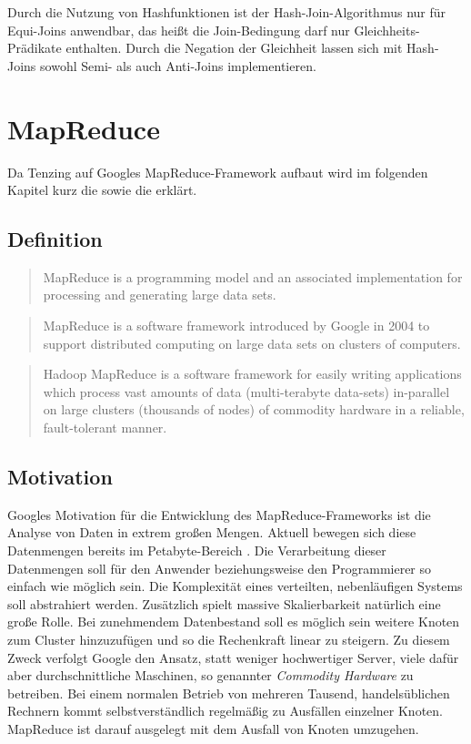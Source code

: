 \documentclass[a4paper]{article}
\begin{document}
Durch die Nutzung von Hashfunktionen ist der Hash-Join-Algorithmus nur für Equi-Joins anwendbar, das heißt die Join-Bedingung darf nur Gleichheits-Prädikate enthalten. Durch die Negation der Gleichheit lassen sich mit Hash-Joins sowohl Semi- als auch Anti-Joins implementieren.

\newpage

\section{MapReduce}
\label{sec:mapreduce}
Da Tenzing auf Googles MapReduce-Framework aufbaut wird im folgenden Kapitel kurz die  sowie die  erklärt.

\subsection{Definition}
\begin{quote}
MapReduce is a programming model and an associated implementation for processing and generating large data sets. \cite{MapReduce:2004}
\end{quote}

\begin{quote}
MapReduce is a software framework introduced by Google in 2004 to support distributed computing on large data sets on clusters of computers. \cite{WP-MAPREDUCE}
\end{quote}

\begin{quote}
Hadoop MapReduce is a software framework for easily writing applications which process vast amounts of data (multi-terabyte data-sets) in-parallel on large clusters (thousands of nodes) of commodity hardware in a reliable, fault-tolerant manner. \cite{Hadoop}
\end{quote}

\subsection{Motivation}
\label{sec:mapreduce-motivation}
Googles Motivation für die Entwicklung des MapReduce-Frameworks ist die Analyse von Daten in extrem großen Mengen. Aktuell bewegen sich diese Datenmengen bereits im Petabyte-Bereich \cite{Tenzing:2011}. Die Verarbeitung dieser Datenmengen soll für den Anwender beziehungsweise den Programmierer so einfach wie möglich sein. Die Komplexität eines verteilten, nebenläufigen Systems soll abstrahiert werden. Zusätzlich spielt massive Skalierbarkeit natürlich eine große Rolle. Bei zunehmendem Datenbestand soll es möglich sein weitere Knoten zum Cluster hinzuzufügen und so die Rechenkraft linear zu steigern. Zu diesem Zweck verfolgt Google den Ansatz, statt weniger hochwertiger Server, viele dafür aber durchschnittliche Maschinen, so genannter \textit{Commodity Hardware} zu betreiben. Bei einem normalen Betrieb von mehreren Tausend, handelsüblichen Rechnern kommt selbstverständlich regelmäßig zu Ausfällen einzelner Knoten. MapReduce ist darauf ausgelegt mit dem Ausfall von Knoten umzugehen. 
\end{document}
